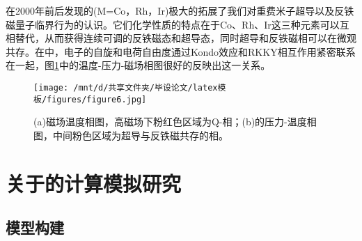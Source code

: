 在2000年前后发现的(M=Co，Rh，Ir)极大的拓展了我们对重费米子超导以及反铁磁量子临界行为的认识。它们化学性质的特点在于Co、Rh、Ir这三种元素可以互相替代，从而获得连续可调的反铁磁态和超导态，同时超导和反铁磁相可以在微观共存。在中，电子的自旋和电荷自由度通过Kondo效应和RKKY相互作用紧密联系在一起，图\ref{fig4}中的温度-压力-磁场相图很好的反映出这一关系。
\begin{figure}[h]
    \centering
    \texttt{[image: /mnt/d/共享文件夹/毕设论文/latex模板/figures/figure6.jpg]}
    \caption{(a)磁场温度相图，高磁场下粉红色区域为Q-相；(b)的压力-温度相图，中间粉色区域为超导与反铁磁共存的相\cite{9}。}
    \label{fig4}
\end{figure}









\section{关于的计算模拟研究}
\subsection{模型构建}
